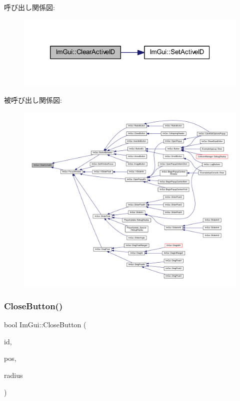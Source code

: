 呼び出し関係図\+:\nopagebreak
\begin{figure}[H]
\begin{center}
\leavevmode
\includegraphics[width=320pt]{namespace_im_gui_a17ff60ad1e2669130ac38a04d16eb354_cgraph}
\end{center}
\end{figure}
被呼び出し関係図\+:\nopagebreak
\begin{figure}[H]
\begin{center}
\leavevmode
\includegraphics[width=350pt]{namespace_im_gui_a17ff60ad1e2669130ac38a04d16eb354_icgraph}
\end{center}
\end{figure}
\mbox{\label{namespace_im_gui_a5e8e4df6418dcda3c4c5d15ecdf7d968}} 
\subsubsection{\texorpdfstring{Close\+Button()}{CloseButton()}}
{\footnotesize\ttfamily bool Im\+Gui\+::\+Close\+Button (\begin{DoxyParamCaption}\item[{\mbox{\hyperlink{imgui_8h_a1785c9b6f4e16406764a85f32582236f}{Im\+Gui\+ID}}}]{id,  }\item[{const \mbox{\hyperlink{struct_im_vec2}{Im\+Vec2}} \&}]{pos,  }\item[{float}]{radius }\end{DoxyParamCaption})}




